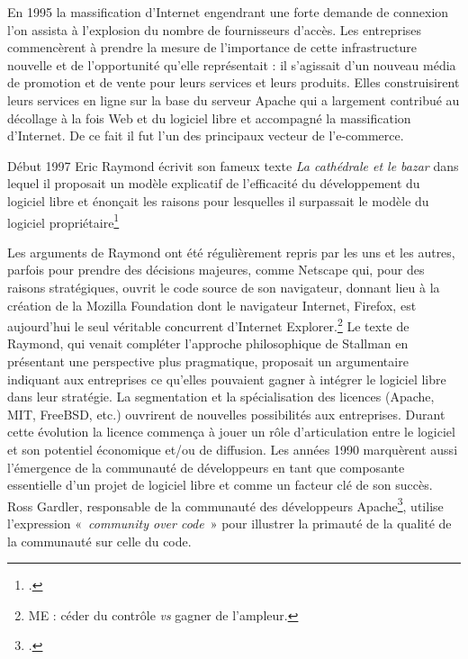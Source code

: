 \documentclass{FramateX}
\begin{document}
\begin{refsection}
En 1995 la massification d'Internet engendrant une forte demande de
connexion l'on assista à l'explosion du nombre de
fournisseurs d'accès. Les entreprises commencèrent à prendre la mesure
de l'importance de cette infrastructure nouvelle et de l'opportunité
qu'elle représentait : il s'agissait d'un nouveau média de promotion et
de vente pour leurs services et leurs produits. Elles construisirent
leurs services en ligne sur la base du serveur Apache qui a largement
contribué au décollage à la fois Web et du logiciel libre et accompagné
la massification d'Internet. De ce fait il fut l'un des principaux
vecteur de l'e-commerce.

Début 1997 Eric Raymond écrivit son fameux texte \textit{La
cathédrale et le bazar} dans lequel il proposait un modèle explicatif
de l'efficacité du développement du logiciel libre et
énonçait les raisons pour lesquelles il surpassait le modèle du
logiciel propriétaire\footnote{\cite{raymondcathedral2001}.}

Les arguments de Raymond ont été régulièrement repris par les uns et les autres, parfois pour prendre
des décisions majeures, comme Netscape qui, pour des raisons
stratégiques, ouvrit le code source de son navigateur, donnant lieu à
la création de la Mozilla Foundation dont le navigateur Internet,
Firefox, est aujourd'hui le seul véritable concurrent
d'Internet Explorer.\footnote{ME : céder du contrôle
\textit{vs} gagner de l'ampleur.} Le texte de
Raymond, qui venait compléter l'approche philosophique de Stallman en
présentant une perspective plus pragmatique, proposait un argumentaire
indiquant aux entreprises ce qu'elles pouvaient gagner
à intégrer le logiciel libre dans leur stratégie. La segmentation et la
spécialisation des licences (Apache, MIT, FreeBSD, etc.) ouvrirent de
nouvelles possibilités aux entreprises. Durant cette évolution la
licence commença à jouer un rôle d'articulation entre
le logiciel et son potentiel économique et/ou de diffusion. Les années
1990 marquèrent aussi l'émergence de la communauté de développeurs en
tant que composante essentielle d'un projet de logiciel libre et comme
un facteur clé de son succès. Ross Gardler, responsable de la
communauté des développeurs Apache\footnote{\cite{gardlercommunity2010}.}, utilise l'expression
«~\textit{community over code}~» pour illustrer la primauté de la
qualité de la communauté sur celle du code.


\end{refsection}
\end{document}
